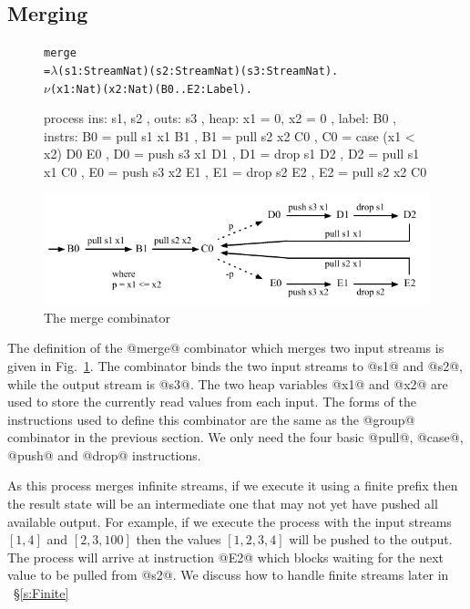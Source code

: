 \subsection{Merging}
\begin{figure}
\begin{alltt}
               merge
                 = \(\lambda\) (s1: Stream Nat) (s2: Stream Nat) (s3: Stream Nat). 
                   \(\nu\) (x1: Nat) (x2: Nat) (B0..E2: Label).
\end{alltt}
\begin{code}
                   process
                   { ins:    { s1, s2 }
                   , outs:   { s3 }
                   , heap:   { x1 = 0, x2 = 0 }
                   , label:  B0
                   , instrs: { B0 = pull s1 x1     B1 {}
                             , B1 = pull s2 x2     C0 {}
                             , C0 = case (x1 < x2) D0 {}  E0 {}
                             , D0 = push s3 x1     D1 {}
                             , D1 = drop s1        D2 {}
                             , D2 = pull s1 x1     C0 {}
                             , E0 = push s3 x2     E1 {}
                             , E1 = drop s2        E2 {}
                             , E2 = pull s2 x2     C0 {} } }
\end{code}

\medskip
\includegraphics[scale=1.1]{figures/state-merge.pdf}
\caption{The merge combinator}
\label{fig:Process:Merge}
\end{figure}

The definition of the @merge@ combinator which merges two input streams is given in Fig.~\ref{fig:Process:Merge}. The combinator binds the two input streams to @s1@ and @s2@, while the output stream is @s3@. The two heap variables @x1@ and @x2@ are used to store the currently read values from each input. The forms of the instructions used to define this combinator are the same as the @group@ combinator in the previous section. We only need the four basic @pull@, @case@, @push@ and @drop@ instructions.

As this process merges infinite streams, if we execute it using a finite prefix then the result state will be an intermediate one that may not yet have pushed all available output. For example, if we execute the process with the input streams $[1, 4]$ and $[2, 3, 100]$ then the values $[1, 2, 3, 4]$ will be pushed to the output. The process will arrive at instruction @E2@ which blocks waiting for the next value to be pulled from @s2@. We discuss how to handle finite streams later in ~\S\ref{s:Finite}


